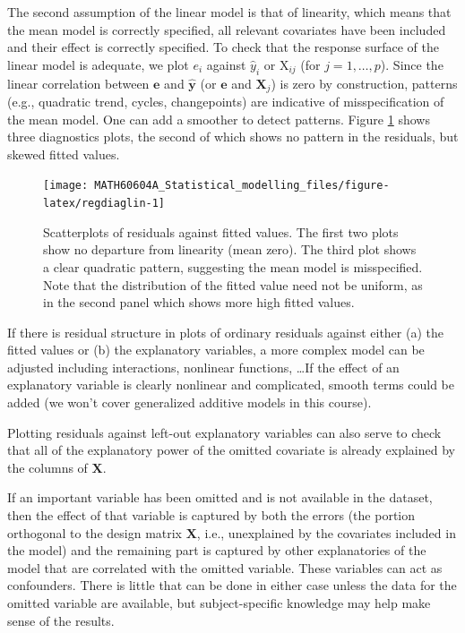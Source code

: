 \documentclass[
  11pt,
  letterpaper,
]{book}
\theoremstyle{definition}
\theoremstyle{definition}
\theoremstyle{definition}
\theoremstyle{remark}
\begin{document}
The second assumption of the linear model is that of linearity, which means that the mean model is correctly specified, all relevant covariates have been included and their effect is correctly specified.
To check that the response surface of the linear model is adequate, we plot \(e_i\) against \(\widehat{y}_i\) or \(\mathrm{X}_{ij}\) (for \(j=1, \ldots, p\)). Since the linear correlation between \(\boldsymbol{e}\) and \(\widehat{\boldsymbol{y}}\) (or \(\boldsymbol{e}\) and \(\mathbf{X}_j\)) is zero by construction, patterns (e.g., quadratic trend, cycles, changepoints) are indicative of misspecification of the mean model. One can add a smoother to detect patterns. Figure \ref{fig:regdiaglin} shows three diagnostics plots, the second of which shows no pattern in the residuals, but skewed fitted values.

\begin{figure}

{\centering \texttt{[image: MATH60604A\_Statistical\_modelling\_files/figure-latex/regdiaglin-1]} 

}

\caption{Scatterplots of residuals against fitted values. The first two plots show no departure from linearity (mean zero). The third plot shows a clear quadratic pattern, suggesting the mean model is misspecified. Note that the distribution of the fitted value need not be uniform, as in the second panel which shows more high fitted values.}\label{fig:regdiaglin}
\end{figure}

If there is residual structure in plots of ordinary residuals against either (a) the fitted values or (b) the explanatory variables, a more complex model can be adjusted including interactions, nonlinear functions, \ldots If the effect of an explanatory variable is clearly nonlinear and complicated, smooth terms could be added (we won't cover generalized additive models in this course).

Plotting residuals against left-out explanatory variables can also serve to check that all of the explanatory power of the omitted covariate is already explained by the columns of \(\mathbf{X}\).

If an important variable has been omitted and is not available in the dataset, then the effect of that variable is captured by both the errors (the portion orthogonal to the design matrix \(\mathbf{X}\), i.e., unexplained by the covariates included in the model) and the remaining part is captured by other explanatories of the model that are correlated with the omitted variable. These variables can act as confounders. There is little that can be done in either case unless the data for the omitted variable are available, but subject-specific knowledge may help make sense of the results.
\end{document}
